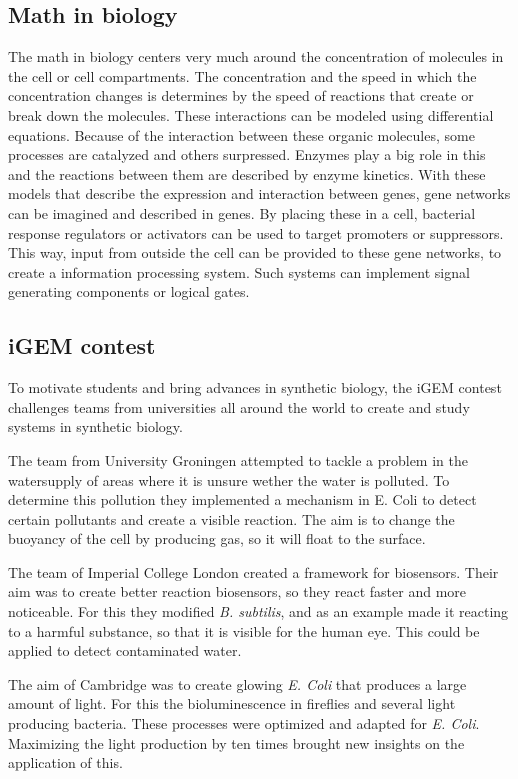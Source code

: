 \documentclass[a4paper]{article}
\begin{document}
\subsection{Math in biology}
The math in biology centers very much around the concentration of molecules in the cell or cell compartments. The concentration and the speed in which the concentration changes is determines by the speed of reactions that create or break down the molecules. These interactions can be modeled using differential equations. Because of the interaction between these organic molecules, some processes are catalyzed and others surpressed. Enzymes play a big role in this and the reactions between them are described by enzyme kinetics. With these models that describe the expression and interaction between genes, gene networks can be imagined and described in genes. By placing these in a cell, bacterial response regulators or activators can be used to target promoters or suppressors. This way, input from outside the cell can be provided to these gene networks, to create a information processing system. Such systems can implement signal generating components or logical gates.

\subsection{iGEM contest}

To motivate students and bring advances in synthetic biology, the iGEM contest challenges teams from universities all around the world to create and study systems in synthetic biology.

The team from University Groningen attempted to tackle a problem in the watersupply of areas where it is unsure wether the water is polluted. To determine this pollution they implemented a mechanism in E. Coli to detect certain pollutants and create a visible reaction. The aim is to change the buoyancy of the cell by producing gas, so it will float to the surface.

The team of Imperial College London created a framework for biosensors. Their aim was to create better reaction biosensors, so they react faster and more noticeable. For this they modified \textit{B. subtilis}, and as an example made it reacting to a harmful substance, so that it is visible for the human eye. This could be applied to detect contaminated water.

The aim of Cambridge was to create glowing \textit{E. Coli} that produces a large amount of light. For this the bioluminescence in fireflies and several light producing bacteria. These processes were optimized and adapted for \textit{E. Coli}. Maximizing the light production by ten times brought new insights on the application of this.
\end{document}
